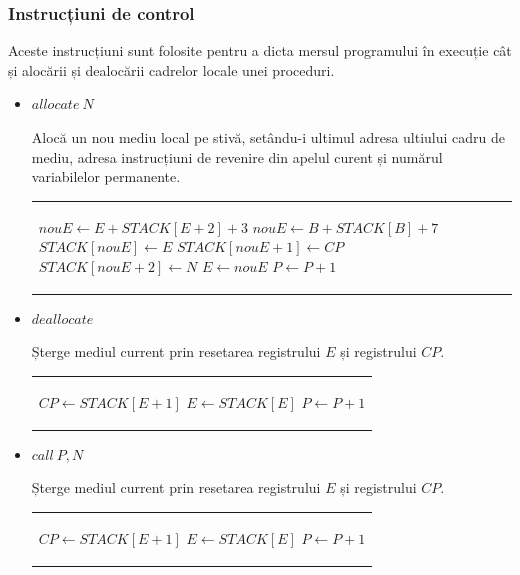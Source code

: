 \documentclass[12pt,a4paper,twoside]{report}
\begin{document}
\subsubsection{Instrucțiuni de control}
Aceste instrucțiuni sunt folosite pentru a dicta mersul programului în execuție cât și alocării și dealocării cadrelor locale unei proceduri.

\begin{itemize}
	\item \(allocate\  N\) \\
	\begin{minipage}{0.45\textwidth}
		   Alocă un nou mediu local pe stivă, setându-i ultimul adresa ultiului cadru de mediu, adresa instrucțiuni de revenire din apelul curent și numărul variabilelor permanente.
	\end{minipage}%
	\hfill
	\begin{minipage}{0.45\textwidth}
	\begin{tabular}{|p{\textwidth}}
	\begin{algorithmic}
		\If{$E > B$}
    			\State $nouE \gets E + STACK[E + 2] + 3$
		\Else
			\State $nouE \gets B + STACK[B] + 7$
		\EndIf
		\State $STACK[nouE] \gets E$
		\State $STACK[nouE+1] \gets CP$
		\State $STACK[nouE+2] \gets N$
		\State $E \gets nouE$
		\State $P \gets P + 1$
	\end{algorithmic}
	\end{tabular}
	\end{minipage}%
	
	\item \(deallocate\) \\
	\begin{minipage}{0.45\textwidth}
		   Șterge mediul current prin resetarea registrului $E$ și registrului $CP$.
	\end{minipage}%
	\hfill
	\begin{minipage}{0.45\textwidth}
	\begin{tabular}{|p{\textwidth}}
	\begin{algorithmic}
		\State $CP \gets STACK[E+1]$
		\State $E \gets STACK[E]$
		\State $P \gets P + 1$
	\end{algorithmic}
	\end{tabular}
	\end{minipage}%
	
	\item \(call\ P,N\) \\
	\begin{minipage}{0.45\textwidth}
		   Șterge mediul current prin resetarea registrului $E$ și registrului $CP$.
	\end{minipage}%
	\hfill
	\begin{minipage}{0.45\textwidth}
	\begin{tabular}{|p{\textwidth}}
	\begin{algorithmic}
		\State $CP \gets STACK[E+1]$
		\State $E \gets STACK[E]$
		\State $P \gets P + 1$
	\end{algorithmic}
	\end{tabular}
	\end{minipage}%
	

\end{itemize}
\end{document}
